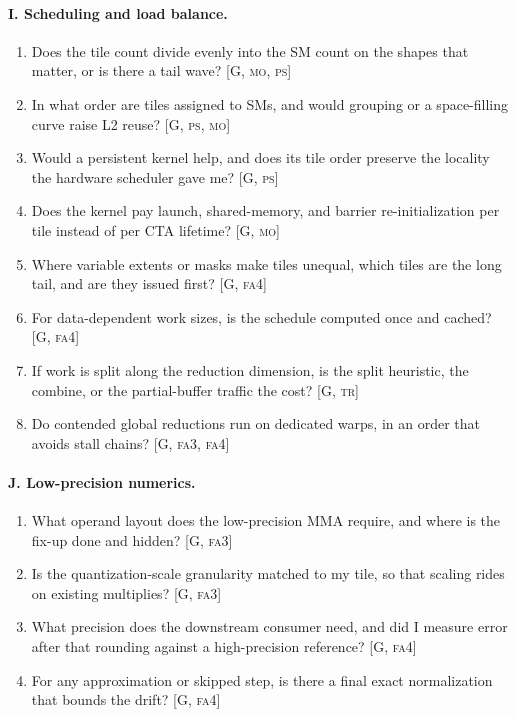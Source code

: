 \paragraph{I. Scheduling and load balance.}
\begin{enumerate}[nosep,leftmargin=*,resume]
\item Does the tile count divide evenly into the SM count on the shapes that matter, or is there a tail wave? [G, \textsc{mo}, \textsc{ps}]
\item In what order are tiles assigned to SMs, and would grouping or a space-filling curve raise L2 reuse? [G, \textsc{ps}, \textsc{mo}]
\item Would a persistent kernel help, and does its tile order preserve the locality the hardware scheduler gave me? [G, \textsc{ps}]
\item Does the kernel pay launch, shared-memory, and barrier re-initialization per tile instead of per CTA lifetime? [G, \textsc{mo}]
\item Where variable extents or masks make tiles unequal, which tiles are the long tail, and are they issued first? [G, \textsc{fa4}]
\item For data-dependent work sizes, is the schedule computed once and cached? [G, \textsc{fa4}]
\item If work is split along the reduction dimension, is the split heuristic, the combine, or the partial-buffer traffic the cost? [G, \textsc{tr}]
\item Do contended global reductions run on dedicated warps, in an order that avoids stall chains? [G, \textsc{fa3}, \textsc{fa4}]
\end{enumerate}

\paragraph{J. Low-precision numerics.}
\begin{enumerate}[nosep,leftmargin=*,resume]
\item What operand layout does the low-precision MMA require, and where is the fix-up done and hidden? [G, \textsc{fa3}]
\item Is the quantization-scale granularity matched to my tile, so that scaling rides on existing multiplies? [G, \textsc{fa3}]
\item What precision does the downstream consumer need, and did I measure error after that rounding against a high-precision reference? [G, \textsc{fa4}]
\item For any approximation or skipped step, is there a final exact normalization that bounds the drift? [G, \textsc{fa4}]
\end{enumerate}

